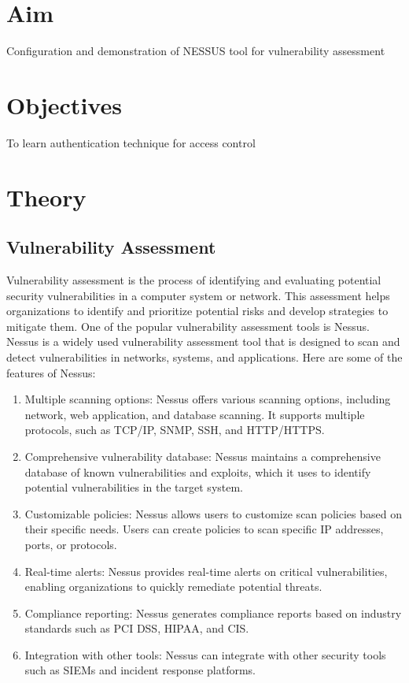 \documentclass[11pt]{article}
\begin{document}
\tableofcontents
\thispagestyle{empty}
\clearpage

\setcounter{page}{1}

\section{Aim}
Configuration and demonstration of NESSUS tool for vulnerability assessment

\section{Objectives}
To learn authentication technique for access control

\section{Theory}
\subsection{Vulnerability Assessment}
Vulnerability assessment is the process of identifying and evaluating potential security vulnerabilities in a computer system or network. This assessment helps organizations to identify and prioritize potential risks and develop strategies to mitigate them. One of the popular vulnerability assessment tools is Nessus.\\

Nessus is a widely used vulnerability assessment tool that is designed to scan and detect vulnerabilities in networks, systems, and applications. Here are some of the features of Nessus:
\begin{enumerate}
    \item Multiple scanning options: Nessus offers various scanning options, including network, web application, and database scanning. It supports multiple protocols, such as TCP/IP, SNMP, SSH, and HTTP/HTTPS.
    \item Comprehensive vulnerability database: Nessus maintains a comprehensive database of known vulnerabilities and exploits, which it uses to identify potential vulnerabilities in the target system.
    \item Customizable policies: Nessus allows users to customize scan policies based on their specific needs. Users can create policies to scan specific IP addresses, ports, or protocols.
    \item Real-time alerts: Nessus provides real-time alerts on critical vulnerabilities, enabling organizations to quickly remediate potential threats.
    \item Compliance reporting: Nessus generates compliance reports based on industry standards such as PCI DSS, HIPAA, and CIS.
    \item Integration with other tools: Nessus can integrate with other security tools such as SIEMs and incident response platforms.

\end{enumerate}
\end{document}
